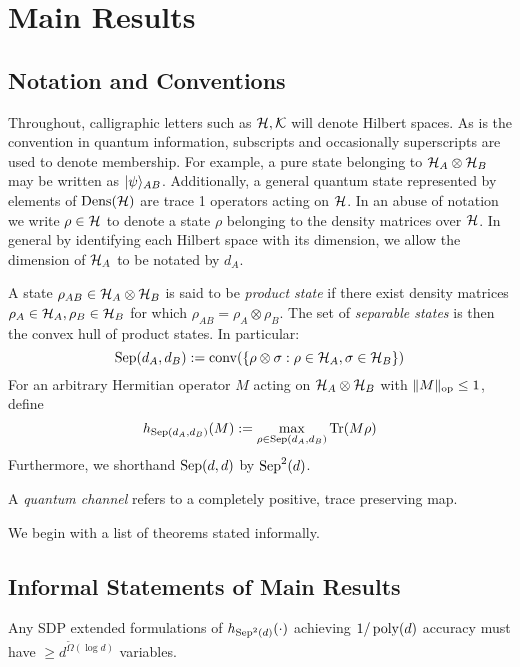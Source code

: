 \documentclass[runningheads,a4paper,english]{llncs}[2022/01/12]
\begin{document}
\section{Main Results}
\label{sec:mainresults}
\subsection{Notation and Conventions}
\label{sec:notation}
Throughout, calligraphic letters such as $\mathcal{H}, \mathcal{K}$ will denote Hilbert spaces.
As is the convention in quantum information, subscripts and occasionally superscripts are used to denote membership.
For example, a pure state belonging to $\mathcal{H}_A \otimes \mathcal{H}_B$ may be written as $\lvert\psi\rangle_{AB}$.
Additionally, a general quantum state represented by elements of $\operatorname{Dens}(\mathcal{H})$ are trace 1 operators acting on $\mathcal{H}$.
In an abuse of notation we write $\rho \in \mathcal{H}$ to denote a state $\rho$ belonging to the density matrices over $\mathcal{H}$.
In general by identifying each Hilbert space with its dimension, we allow the dimension of $\mathcal{H}_A$ to be notated by $d_A$.

A state $\rho_{AB} \in \mathcal{H}_A \otimes \mathcal{H}_B$ is said to be \emph{product state} if there exist density matrices $\rho_A \in \mathcal{H}_A, \rho_B \in \mathcal{H}_B$ for which $\rho_{AB} = \rho_A \otimes \rho_B$.
The set of \emph{separable states} is then the convex hull of product states.
In particular:
\[\operatorname{Sep}(d_A, d_B) := \operatorname{conv}(\{\rho \otimes \sigma : \rho \in \mathcal{H}_A, \sigma \in \mathcal{H}_B\})\]
For an arbitrary Hermitian operator $M$ acting on $\mathcal{H}_A \otimes \mathcal{H}_B$ with $\lVert M\rVert_{\text{op}} \le 1$, define
\[h_{\operatorname{Sep}(d_A, d_B)}(M) := \max_{\rho\in \operatorname{Sep}(d_A, d_B)} \operatorname{Tr}(M\rho)\]
Furthermore, we shorthand $\operatorname{Sep}(d, d)$ by $\operatorname{Sep}^2(d)$.

A \emph{quantum channel} refers to a completely positive, trace preserving map.

We begin with a list of theorems stated informally.
\subsection{Informal Statements of Main Results}
\label{sec:informalmain}
\begin{theorem}
Any SDP extended formulations of $h_{\operatorname{Sep}^2(d)}(\cdot)$ achieving $1/\operatorname{poly}(d)$ accuracy must have $\ge d^{\tilde{\Omega}(\log d)}$ variables.
\end{theorem}
\end{document}
